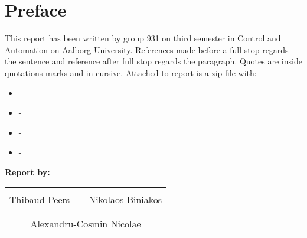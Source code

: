 \chapter*{Preface}
This report has been written by group 931 on third semester in Control and Automation on Aalborg University.
References made before a full stop regards the sentence and reference after full stop regards the paragraph. Quotes are inside quotations marks and in cursive.
Attached to report is a zip file with:
\begin{itemize}
	\item -
	\item -
	\item -
	\item -
\end{itemize}
\vspace{2cm}

\textbf{Report by:}\\
\vspace{-5pt}
\begin{table}[H]
	\centering
	\begin{tabular}{c c c}
		\underline{\phantom{JAERJAERJAERJAERGO}} & \phantom{cookies} & \underline{\phantom{JAERJAERJAERJAERGO}} \\
		 Thibaud Peers		& \phantom{cookies} &  Nikolaos Biniakos	\\
		&&\\
		\multicolumn{3}{c}{\underline{\phantom{JAERJAERJAERJAERGO}}}\\
		\multicolumn{3}{c}{Alexandru-Cosmin Nicolae}\\				
						
	\end{tabular}
\end{table}


\pagebreak
